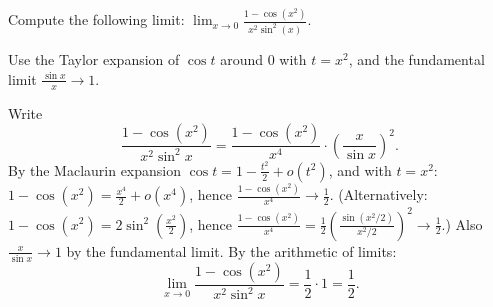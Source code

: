 
\begin{question}
Compute the following limit: $\lim_{x\to 0}\frac{1-\cos(x^2)}{x^2\sin^2(x)}$.
\end{question}

\begin{hint}
Use the Taylor expansion of $\cos t$ around $0$ with $t=x^2$, and the fundamental limit $\frac{\sin x}{x}\to1$.
\end{hint}

\begin{solution}
Write
\[ \frac{1-\cos(x^2)}{x^2\sin^2 x}=\frac{1-\cos(x^2)}{x^4}\cdot\left(\frac{x}{\sin x}\right)^2. \]
By the Maclaurin expansion $\cos t=1-\frac{t^2}{2}+o(t^2)$, and with $t=x^2$: $1-\cos(x^2)=\frac{x^4}{2}+o(x^4)$, hence $\frac{1-\cos(x^2)}{x^4}\to\frac12$.
(Alternatively: $1-\cos(x^2)=2\sin^2(\frac{x^2}{2})$, hence $\frac{1-\cos(x^2)}{x^4}=\frac12\left(\frac{\sin(x^2/2)}{x^2/2}\right)^2\to\frac12$.)
Also $\frac{x}{\sin x}\to 1$ by the fundamental limit. By the arithmetic of limits:
\[ \lim_{x\to0}\frac{1-\cos(x^2)}{x^2\sin^2 x}=\frac12\cdot 1=\boxed{\frac12}. \]
\end{solution}
